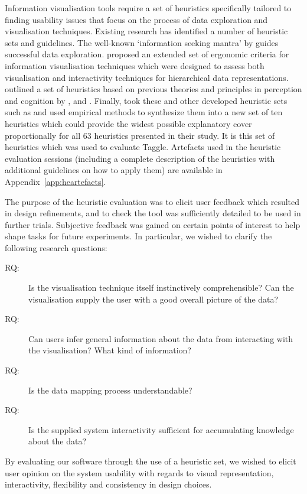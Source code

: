 Information visualisation tools require a set of heuristics specifically tailored to finding usability issues that focus on the process of data exploration and visualisation techniques. Existing research has identified a number of heuristic sets and guidelines. The well-known `information seeking mantra' by \citet{schneiderman96} guides successful data exploration. \citet{luzzardi04} proposed an extended set of ergonomic criteria for information visualisation techniques which were designed to assess both visualisation and interactivity techniques for hierarchical data representations. \citet{zuk06b} outlined a set of heuristics based on previous theories and principles in perception and cognition by \citet{bertin83}, \citet{tufte90} and \citet{ware04}. Finally, \citet{forsell10} took these and other developed heuristic sets such as \citep{nielsen92} and used empirical methods to synthesize them into a new set of ten heuristics which could provide the widest possible explanatory cover proportionally for all 63 heuristics presented in their study. It is this set of heuristics which was used to evaluate Taggle. Artefacts used in the heuristic evaluation sessions (including a complete description of the heuristics with additional guidelines on how to apply them) are available in Appendix~\ref{app:heartefacts}.

The purpose of the heuristic evaluation was to elicit user feedback which resulted in design refinements, and to check the tool was sufficiently detailed to be used in further trials. Subjective feedback was gained on certain points of interest to help shape tasks for future experiments. In particular, we wished to clarify the following research questions:

\begin{description}
  \item[RQ:]Is the visualisation technique itself instinctively comprehensible? Can the visualisation supply the user with a good overall picture of the data?
  \item[RQ:]Can users infer general information about the data from interacting with the visualisation? What kind of information? 
  \item[RQ:]Is the data mapping process understandable?
  \item[RQ:]Is the supplied system interactivity sufficient for accumulating knowledge about the data? 
\end{description}

By evaluating our software through the use of a heuristic set, we wished to elicit user opinion on the system usability with regards to visual representation, interactivity, flexibility and consistency in design choices.

